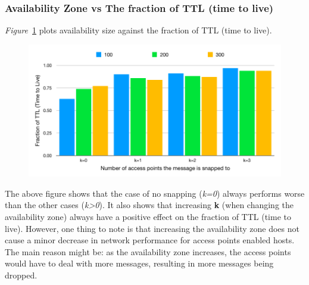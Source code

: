{\subsubsection{Availability Zone vs The fraction of TTL (time to live)}
\emph{Figure}~\ref{fig:scenario2_3_availability_zone} plots availability size against the fraction of TTL (time to live).
\begin{figure}[H]
  \centering
  \includegraphics[scale=0.39]{./figures/scenario2_3_availability_zone}
  \label{fig:scenario2_3_availability_zone}
\end{figure}
The above figure shows that the case of no snapping (\textit{k=0}) always performs worse than the other cases (\textit{k>0}). It also shows that increasing \textbf{k} (when changing the availability zone) always have a positive effect on the fraction of TTL (time to live). However, one thing to note is that increasing the availability zone does not cause a minor decrease in network performance for access points enabled hosts. The main reason might be: as the availability zone increases, the access points would have to deal with more messages, resulting in more messages being dropped.
}
